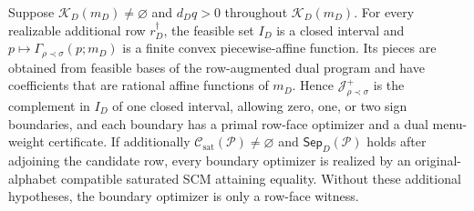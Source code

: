 Suppose \(\mathcal K_D(m_D)\ne\varnothing\) and \(d_Dq>0\) throughout \(\mathcal K_D(m_D)\). For every realizable additional row \(r_D^\dagger\), the feasible set \(I_D\) is a closed interval and \(p\mapsto\Gamma_{\rho\prec\sigma}(p;m_D)\) is a finite convex piecewise-affine function. Its pieces are obtained from feasible bases of the row-augmented dual program and have coefficients that are rational affine functions of \(m_D\). Hence \(\mathcal J_{\rho\prec\sigma}^+\) is the complement in \(I_D\) of one closed interval, allowing zero, one, or two sign boundaries, and each boundary has a primal row-face optimizer and a dual menu-weight certificate. If additionally \(\mathcal C_{\mathrm{sat}}(\mathcal P)\ne\varnothing\) and \(\mathsf{Sep}_D(\mathcal P)\) holds after adjoining the candidate row, every boundary optimizer is realized by an original-alphabet compatible saturated SCM attaining equality. Without these additional hypotheses, the boundary optimizer is only a row-face witness.